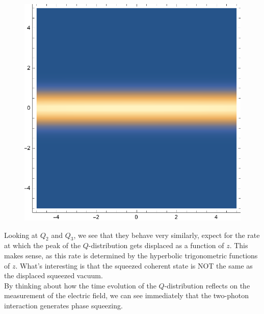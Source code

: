 \documentclass{article}
\theoremstyle{definition}
\begin{document}
\begin{enumerate}[label=(\alph*)]
\begin{itemize}
\begin{figure}[!htb]
	\begin{minipage}{.3\textwidth}
  	\centering
  	\includegraphics[width=.55\linewidth]{figures/Q3-z-40.eps}
	\end{minipage}
\end{figure} 

\end{itemize}


Looking at $Q_2$ and $Q_3$, we see that they behave very similarly, expect for the rate at which the peak of the $Q$-distribution gets displaced as a function of $z$. This makes sense, as this rate is determined by the hyperbolic trigonometric functions of $z$. What's interesting is that the squeezed coherent state is NOT the same as the displaced squeezed vacuum. \\

By thinking about how the time evolution of the $Q$-distribution reflects on the measurement of the electric field, we can see immediately that the two-photon interaction generates phase squeezing. 


\end{enumerate}
\end{document}
